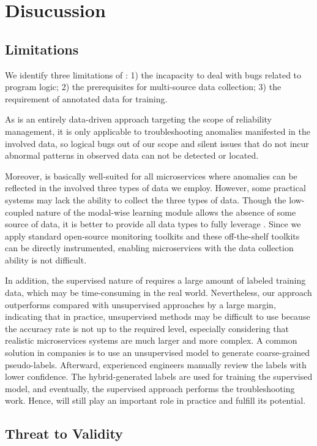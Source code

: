 \section{Disucussion}\label{sec:threats}
\subsection{Limitations}
We identify three limitations of \name: 1) the incapacity to deal with bugs related to program logic; 2) the prerequisites for multi-source data collection; 3) the requirement of annotated data for training.

As \name is an entirely data-driven approach targeting the scope of reliability management, it is only applicable to troubleshooting anomalies manifested in the involved data, so logical bugs out of our scope and silent issues that do not incur abnormal patterns in observed data can not be detected or located.

Moreover, \name is basically well-suited for all microservices where anomalies can be reflected in the involved three types of data we employ. However, some practical systems may lack the ability to collect the three types of data. Though the low-coupled nature of the modal-wise learning module allows the absence of some source of data, it is better to provide all data types to fully leverage \name.
Since we apply standard open-source monitoring toolkits and these off-the-shelf toolkits can be directly instrumented, enabling microservices with the data collection ability is not difficult.

In addition, the supervised nature of \name requires a large amount of labeled training data, which may be time-consuming in the real world. 
Nevertheless, our approach outperforms compared with unsupervised approaches by a large margin, indicating that in practice, unsupervised methods may be difficult to use because the accuracy rate is not up to the required level, especially considering that realistic microservices systems are much larger and more complex.
A common solution in companies is to use an unsupervised model to generate coarse-grained pseudo-labels. Afterward, experienced engineers manually review the labels with lower confidence.
The hybrid-generated labels are used for training the supervised model, and eventually, the supervised approach performs the troubleshooting work.
Hence, \name will still play an important role in practice and fulfill its potential.

\subsection{Threat to Validity}
